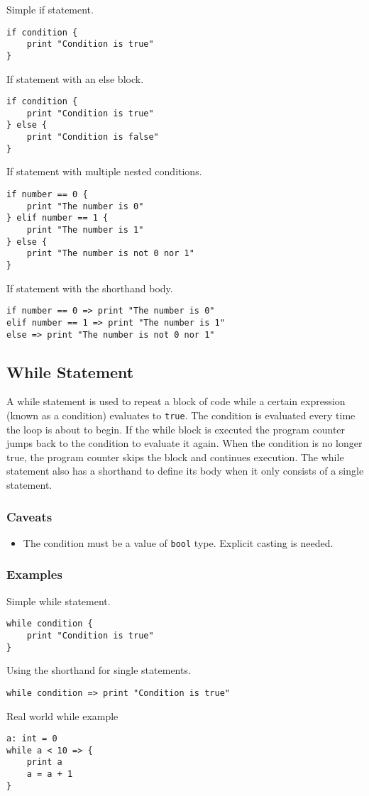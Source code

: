 Simple if statement.
\begin{lstlisting}
if condition {
    print "Condition is true"
}
\end{lstlisting}
If statement with an else block.
\begin{lstlisting}
if condition {
    print "Condition is true"
} else {
    print "Condition is false"
}
\end{lstlisting}
If statement with multiple nested conditions.
\begin{lstlisting}
if number == 0 {
    print "The number is 0"
} elif number == 1 {
    print "The number is 1"
} else {
    print "The number is not 0 nor 1"
}
\end{lstlisting}
If statement with the shorthand body.
\begin{lstlisting}
if number == 0 => print "The number is 0"
elif number == 1 => print "The number is 1"
else => print "The number is not 0 nor 1"
\end{lstlisting}

\subsection{While Statement}

A while statement is used to repeat a block of code while a certain expression (known as a condition) evaluates to \texttt{true}.
The condition is evaluated every time the loop is about to begin. If the while block is executed the program counter jumps back
to the condition to evaluate it again. When the condition is no longer true, the program counter skips the block and continues execution.
The while statement also has a shorthand to define its body when it only consists of a single statement.

\subsubsection{Caveats}

\begin{itemize}
    \item The condition must be a value of \texttt{bool} type. Explicit casting is needed.
\end{itemize}

\subsubsection{Examples}

Simple while statement.
\begin{lstlisting}
while condition {
    print "Condition is true"
}
\end{lstlisting}
Using the shorthand for single statements.
\begin{lstlisting}
while condition => print "Condition is true"
\end{lstlisting}
Real world while example
\begin{lstlisting}
a: int = 0
while a < 10 => {
    print a
    a = a + 1
}
\end{lstlisting}


